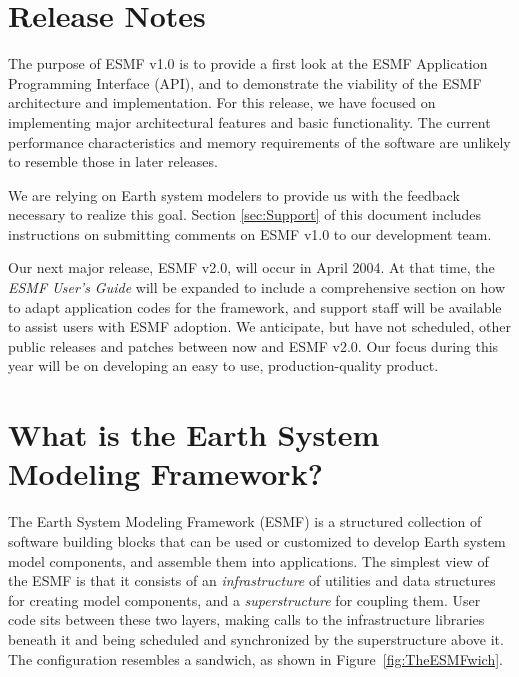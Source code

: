 
\section{Release Notes}

The purpose of ESMF v1.0 is to provide a first look at the ESMF
Application Programming Interface (API), and to demonstrate the viability 
of the ESMF architecture and implementation.  For this release, we have focused 
on implementing major architectural features and basic functionality.  The 
current performance characteristics and memory requirements of the software 
are unlikely to resemble those in later releases.  

We are relying on Earth system modelers to provide us with the feedback necessary 
to realize this goal.  Section \ref{sec:Support} of this document includes 
instructions on submitting comments on ESMF v1.0 to our development team.

Our next major release, ESMF v2.0, will occur in April 2004.  At that time, 
the {\it ESMF User's Guide} will be expanded to include a comprehensive section 
on how to adapt application codes for the framework, and support staff will be 
available to assist users with ESMF adoption.  We anticipate, but have 
not scheduled, other public releases and patches between now and ESMF v2.0.  
Our focus during this year will be on developing an easy to use, production-quality 
product.  

\section{What is the Earth System Modeling Framework?}

The Earth System Modeling Framework (ESMF) is a structured collection of 
software building blocks that can be used or customized to develop 
Earth system model components, and assemble them into applications.  
The simplest view of the ESMF is that it consists of an {\it infrastructure} 
of utilities and data structures for creating 
model components, and a {\it superstructure} for coupling them.  
User code sits between these two layers, making calls to the infrastructure
libraries beneath it and being scheduled and synchronized by the 
superstructure above it.  The configuration resembles a sandwich, as
shown in Figure~\ref{fig:TheESMFwich}.

